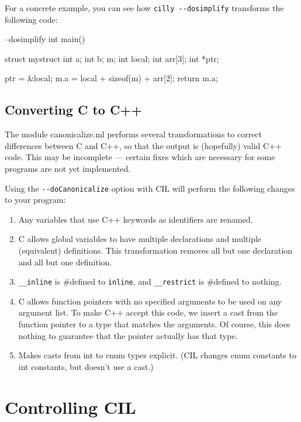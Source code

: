 \documentclass{article}
\def\t#1{{\tt #1}}
\begin{document}
For a concrete example, you can see how \t{cilly -{}-dosimplify} 
transforms the following code:

\begin{cilcode}[global] --dosimplify
  int main() {
    struct mystruct {
      int a;
      int b;
    } m;
    int local;
    int arr[3];
    int *ptr;

    ptr = &local;
    m.a = local + sizeof(m) + arr[2];
    return m.a; 
  } 
\end{cilcode}

\subsection{Converting C to C++}

The module canonicalize.ml performs several transformations to correct
differences between C and C++, so that the output is (hopefully) valid
C++ code.  This may be incomplete --- certain fixes which are necessary
for some programs are not yet implemented.

Using the \t{-{}-doCanonicalize} option with CIL will perform the
following changes to your program:

\begin{enumerate}
\item Any variables that use C++ keywords as identifiers are renamed.
\item C allows global variables to have multiple declarations and
      multiple (equivalent) definitions.  This transformation removes
      all but one declaration and all but one definition.
\item \t{\_\_inline} is \#defined to \t{inline}, and \t{\_\_restrict} 
      is \#defined to nothing.
\item C allows function pointers with no specified arguments to be used on
      any argument list.  To make C++ accept this code, we insert a cast
      from the function pointer to a type that matches the arguments.  Of
      course, this does nothing to guarantee that the pointer actually has
      that type.
\item Makes casts from int to enum types explicit.  (CIL changes enum
      constants to int constants, but doesn't use a cast.)
\end{enumerate}



\section{Controlling CIL}
\end{document}
